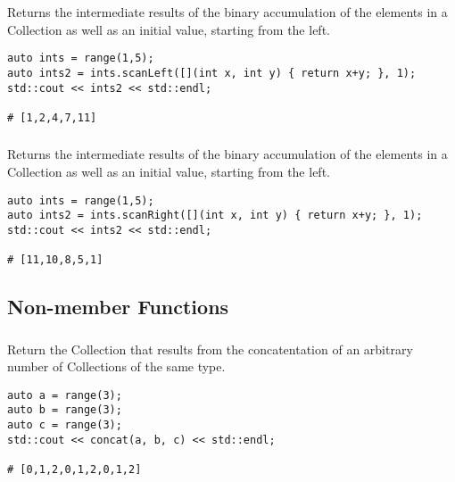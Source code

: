 Returns the intermediate results of the binary accumulation of the elements in a Collection as well as an initial value, starting from the left.

\begin{lstlisting}[title=example]
auto ints = range(1,5);
auto ints2 = ints.scanLeft([](int x, int y) { return x+y; }, 1);
std::cout << ints2 << std::endl;

# [1,2,4,7,11]
\end{lstlisting}




\subsubsection{}

Returns the intermediate results of the binary accumulation of the elements in a Collection as well as an initial value, starting from the left.

\begin{lstlisting}[title=example]
auto ints = range(1,5);
auto ints2 = ints.scanRight([](int x, int y) { return x+y; }, 1);
std::cout << ints2 << std::endl;

# [11,10,8,5,1]
\end{lstlisting}




\subsection{Non-member Functions}

\subsubsection{}

Return the Collection that results from the concatentation of an arbitrary number of Collections of the same type.

\begin{lstlisting}[title=example]
auto a = range(3);
auto b = range(3);
auto c = range(3);
std::cout << concat(a, b, c) << std::endl;

# [0,1,2,0,1,2,0,1,2]
\end{lstlisting}





\subsubsection{}

